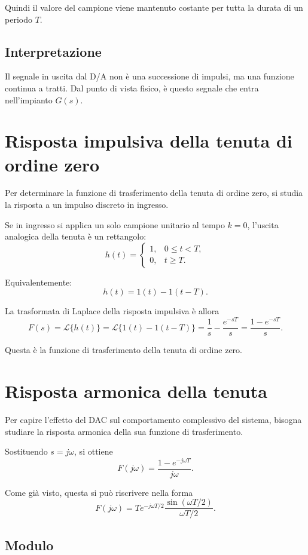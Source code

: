 Quindi il valore del campione viene mantenuto costante per tutta la durata di un periodo \(T\).

\subsection{Interpretazione}

Il segnale in uscita dal D/A non è una successione di impulsi, ma una funzione continua a tratti.
Dal punto di vista fisico, è questo segnale che entra nell'impianto \(G(s)\).

\section{Risposta impulsiva della tenuta di ordine zero}

Per determinare la funzione di trasferimento della tenuta di ordine zero,
si studia la risposta a un impulso discreto in ingresso.

Se in ingresso si applica un solo campione unitario al tempo \(k=0\),
l'uscita analogica della tenuta è un rettangolo:
\[
h(t)=
\begin{cases}
1, & 0\le t < T,\\
0, & t\ge T.
\end{cases}
\]

Equivalentemente:
\[
h(t)=1(t)-1(t-T).
\]

La trasformata di Laplace della risposta impulsiva è allora
\[
F(s)=\mathcal{L}\{h(t)\}
=
\mathcal{L}\{1(t)-1(t-T)\}
=
\frac{1}{s}-\frac{e^{-sT}}{s}
=
\frac{1-e^{-sT}}{s}.
\]

Questa è la funzione di trasferimento della tenuta di ordine zero.

\section{Risposta armonica della tenuta}

Per capire l'effetto del DAC sul comportamento complessivo del sistema,
bisogna studiare la risposta armonica della sua funzione di trasferimento.

Sostituendo \(s=j\omega\), si ottiene
\[
F(j\omega)=\frac{1-e^{-j\omega T}}{j\omega}.
\]

Come già visto, questa si può riscrivere nella forma
\[
F(j\omega)=T e^{-j\omega T/2}\frac{\sin(\omega T/2)}{\omega T/2}.
\]

\subsection{Modulo}

